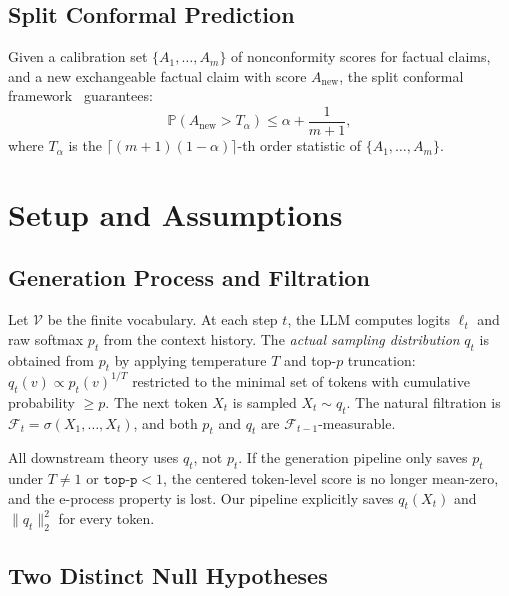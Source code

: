 \documentclass[runningheads]{llncs}
\begin{document}
\subsection{Split Conformal Prediction}

Given a calibration set $\{A_1, \ldots, A_m\}$ of nonconformity scores for
factual claims, and a new exchangeable factual claim with score
$A_{\text{new}}$, the split conformal
framework~\cite{vovk2005algorithmic,lei2018distribution} guarantees:
\begin{equation}
\mathbb{P}\!\left(A_{\text{new}} > T_\alpha \right) \le \alpha + \frac{1}{m+1},
\end{equation}
where $T_\alpha$ is the
$\lceil (m+1)(1-\alpha) \rceil$-th order statistic of
$\{A_1, \ldots, A_m\}$.

\section{Setup and Assumptions}

\subsection{Generation Process and Filtration}

Let $\mathcal{V}$ be the finite vocabulary. At each step $t$, the LLM
computes logits $\ell_t$ and raw softmax $p_t$ from the context history.
The \textit{actual sampling distribution} $q_t$ is obtained from $p_t$ by
applying temperature $T$ and top-$p$ truncation:
$q_t(v) \propto p_t(v)^{1/T}$ restricted to the minimal set of tokens with
cumulative probability $\ge p$. The next token $X_t$ is sampled
$X_t \sim q_t$. The natural filtration is
$\mathcal{F}_t = \sigma(X_1, \ldots, X_t)$, and both $p_t$ and $q_t$ are
$\mathcal{F}_{t-1}$-measurable.

\begin{remark}
All downstream theory uses $q_t$, not $p_t$. If the generation pipeline only
saves $p_t$ under $T \neq 1$ or $\texttt{top-p} < 1$, the centered token-level
score is no longer mean-zero, and the e-process property is lost.
Our pipeline explicitly saves $q_t(X_t)$ and $\|q_t\|_2^2$ for every token.
\end{remark}

\subsection{Two Distinct Null Hypotheses}
\end{document}
